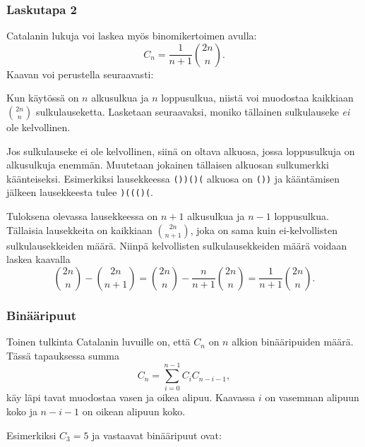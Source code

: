 \subsubsection{Laskutapa 2}

Catalanin lukuja voi laskea myös binomikertoimen avulla:
\[ C_n = \frac{1}{n+1} {2n \choose n}. \]
Kaavan voi perustella seuraavasti:

Kun käytössä on $n$ alkusulkua ja $n$ loppusulkua,
niistä voi muodostaa kaikkiaan ${2n \choose n}$
sulkulauseketta.
Lasketaan seuraavaksi, moniko tällainen
sulkulauseke \textit{ei} ole kelvollinen.

Jos sulkulauseke ei ole kelvollinen,
siinä on oltava alkuosa,
jossa loppusulkuja on alkusulkuja enemmän.
Muutetaan jokainen tällaisen alkuosan
sulkumerkki käänteiseksi.
Esimerkiksi lausekkeessa \texttt{())()(}
alkuosa on \texttt{())} ja kääntämisen
jälkeen lausekkeesta tulee \texttt{)((()(}.

Tuloksena olevassa lausekkeessa on $n+1$ alkusulkua
ja $n-1$ loppusulkua. Tällaisia lausekkeita on
kaikkiaan ${2n \choose n+1}$,
joka on sama kuin ei-kelvollisten
sulkulausekkeiden määrä.
Niinpä kelvollisten
sulkulausekkeiden määrä voidaan laskea kaavalla
\[{2n \choose n}-{2n \choose n+1} = {2n \choose n} - \frac{n}{n+1} {2n \choose n} = \frac{1}{n+1} {2n \choose n}.\]

\subsubsection{Binääripuut}

Toinen tulkinta Catalanin luvuille on,
että $C_n$ on $n$ alkion binääripuiden määrä.
Tässä tapauksessa summa
\[ C_n = \sum_{i=0}^{n-1} C_{i} C_{n-i-1},\]
käy läpi tavat muodostaa vasen ja oikea alipuu.
Kaavassa $i$ on vasemman alipuun koko ja 
$n-i-1$ on oikean alipuun koko.

Esimerkiksi $C_3=5$ ja vastaavat binääripuut ovat:

